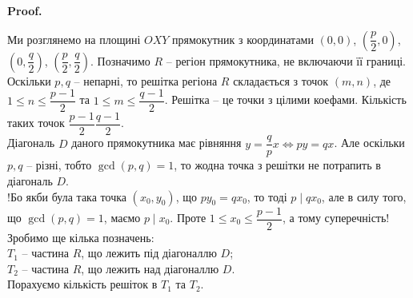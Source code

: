 \documentclass[a4paper, 10pt]{article}
\makeatletter
\theoremstyle{theoremdd}
\theoremstyle{theoremdd}
\theoremstyle{theoremdd}
\theoremstyle{theoremdd}
\theoremstyle{theoremdd}
\theoremstyle{theoremdd}
\theoremstyle{theoremdd}
\theoremstyle{theoremdd}
\renewenvironment{proof}[1][Proof.\\]{\par
\pushQED{\hfill \qed}%
\normalfont \topsep6\p@\@plus6\p@\relax
\trivlist
\item\relax
{\bfseries
#1\@addpunct{.}}\hspace\labelsep\ignorespaces
}{%
\popQED\endtrivlist\@endpefalse
}
\makeatother
\begin{document}
\begin{proof}
Ми розглянемо на площині $OXY$ прямокутник з координатами $\left(0,0 \right)$, $\left(\dfrac{p}{2},0 \right)$, $\left(0,\dfrac{q}{2} \right)$, $\left(\dfrac{p}{2},\dfrac{q}{2} \right)$. Позначимо $R$ -- регіон прямокутника, не включаючи її границі.\\
Оскільки $p,q$ -- непарні, то решітка регіона $R$ складається з точок $(m,n)$, де $1 \leq n \leq \dfrac{p-1}{2}$ та $1 \leq m \leq \dfrac{q-1}{2}$. Решітка -- це точки з цілими коефами. Кількість таких точок $\dfrac{p-1}{2} \dfrac{q-1}{2}$.\\
Діагональ $D$ даного прямокутника має рівняння $y = \dfrac{q}{p}x \iff py = qx$. Але оскільки $p,q$ -- різні, тобто $\gcd(p,q) = 1$, то жодна точка з решітки не потрапить в діагональ $D$.\\
!Бо якби була така точка $(x_0,y_0)$, що $py_0 = qx_0$, то тоді $p \mid qx_0$, але в силу того, що $\gcd(p,q) = 1$, маємо $p \mid x_0$. Проте $1 \leq x_0 \leq \dfrac{p-1}{2}$, а тому суперечність!\\
Зробимо ще кілька позначень:\\
$T_1$ -- частина $R$, що лежить під діагоналлю $D$; \\
$T_2$ -- частина $R$, що лежить над діагоналлю $D$. \\
Порахуємо кількість решіток в $T_1$ та $T_2$.
\begin{figure}[H]
\centering
{}
\end{figure}
\end{proof}
\end{document}
